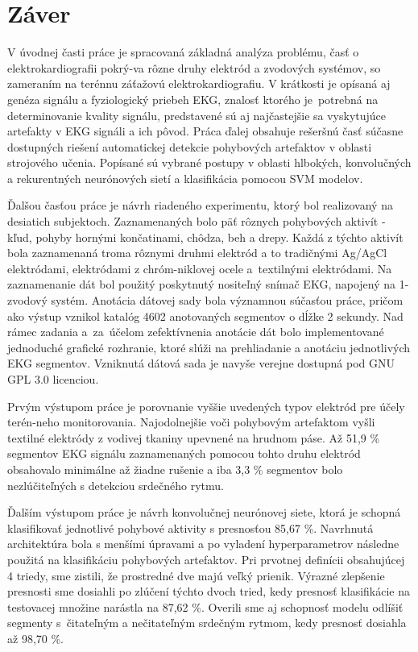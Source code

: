 \chapter{Záver}


V úvodnej časti práce je spracovaná základná analýza problému, časť o elektrokardiografii pokrý-va rôzne druhy elektród a zvodových systémov, so zameraním na terénnu záťažovú elektrokardiografiu. V krátkosti je opísaná aj genéza signálu a fyziologický priebeh EKG, znalosť ktorého je~potrebná na determinovanie kvality signálu, predstavené sú aj najčastejšie sa vyskytujúce artefakty v EKG signáli a ich pôvod. Práca ďalej obsahuje rešeršnú časť súčasne dostupných riešení automatickej detekcie pohybových artefaktov v oblasti strojového učenia. Popísané sú vybrané postupy v oblasti hlbokých, konvolučných a rekurentných neurónových sietí a klasifikácia pomocou SVM modelov.

Ďalšou časťou práce je návrh riadeného experimentu, ktorý bol realizovaný na desiatich subjektoch. Zaznamenaných bolo päť rôznych pohybových aktivít - kľud, pohyby hornými končatinami, chôdza, beh a drepy. Každá z týchto aktivít bola zaznamenaná troma rôznymi druhmi elektród a to tradičnými Ag/AgCl elektródami, elektródami z chróm-niklovej ocele a~textilnými elektródami. Na zaznamenanie dát bol použitý poskytnutý nositeľný snímač EKG, napojený na 1-zvodový systém. Anotácia dátovej sady bola významnou súčasťou práce, pričom ako výstup vznikol katalóg 4602 anotovaných segmentov o dĺžke 2 sekundy. Nad rámec zadania a~za~účelom zefektívnenia anotácie dát bolo implementované jednoduché grafické rozhranie, ktoré slúži na prehliadanie a anotáciu jednotlivých EKG segmentov. Vzniknutá dátová sada je navyše verejne dostupná pod GNU GPL 3.0 licenciou. 

Prvým výstupom práce je porovnanie vyššie uvedených typov elektród pre účely terén-neho monitorovania. Najodolnejšie voči pohybovým artefaktom vyšli textilné elektródy z vodivej tkaniny upevnené na hrudnom páse. Až 51,9 \% segmentov EKG signálu zaznamenaných pomocou tohto druhu elektród obsahovalo minimálne až žiadne rušenie a iba 3,3 \% segmentov bolo nezlúčiteľných s detekciou srdečného rytmu. 

Ďalším výstupom práce je návrh konvolučnej neurónovej siete, ktorá je schopná klasifikovať jednotlivé pohybové aktivity s presnosťou 85,67 \%. Navrhnutá architektúra bola s menšími úpravami a po vyladení hyperparametrov následne použitá na klasifikáciu pohybových artefaktov. Pri prvotnej definícii obsahujúcej 4 triedy, sme zistili, že prostredné dve majú veľký prienik. Výrazné zlepšenie presnosti sme dosiahli po zlúčení týchto dvoch tried, kedy presnosť klasifikácie na testovacej množine narástla na 87,62 \%. Overili sme aj schopnosť modelu odlíšiť segmenty s~čitateľným a nečitateľným srdečným rytmom, kedy presnosť dosiahla až 98,70 \%.

